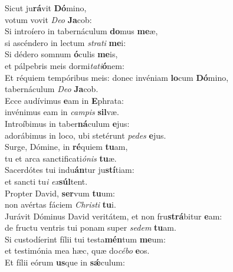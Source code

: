 \evenverse Sicut ju\textbf{rá}vit \textbf{Dó}mino,~\*\\
\evenverse votum vovit \textit{De}\textit{o} \textbf{Ja}cob:\\
\oddverse Si introíero in tabernáculum \textbf{do}mus \textbf{me}æ,~\*\\
\oddverse si ascéndero in lectum \textit{stra}\textit{ti} \textbf{me}i:\\
\evenverse Si dédero somnum \textbf{ó}culis \textbf{me}is,~\*\\
\evenverse et pálpebris meis dormi\textit{ta}\textit{ti}\textbf{ó}nem:\\
\oddverse Et réquiem tempóribus meis: donec invéniam \textbf{lo}cum \textbf{Dó}mino,~\*\\
\oddverse tabernáculum \textit{De}\textit{o} \textbf{Ja}cob.\\
\evenverse Ecce audívimus \textbf{e}am in \textbf{E}phrata:~\*\\
\evenverse invénimus eam in \textit{cam}\textit{pis} \textbf{sil}væ.\\
\oddverse Introíbimus in taber\textbf{ná}culum \textbf{e}jus:~\*\\
\oddverse adorábimus in loco, ubi stetérunt \textit{pe}\textit{des} \textbf{e}jus.\\
\evenverse Surge, Dómine, in \textbf{ré}quiem \textbf{tu}am,~\*\\
\evenverse tu et arca sanctificati\textit{ó}\textit{nis} \textbf{tu}æ.\\
\oddverse Sacerdótes tui indu\textbf{án}tur ju\textbf{stí}tiam:~\*\\
\oddverse et sancti tu\textit{i} \textit{ex}\textbf{súl}tent.\\
\evenverse Propter David, \textbf{ser}vum \textbf{tu}um:~\*\\
\evenverse non avértas fáciem \textit{Chri}\textit{sti} \textbf{tu}i.\\
\oddverse Jurávit Dóminus David veritátem, et non fru\textbf{strá}bitur \textbf{e}am:~\*\\
\oddverse de fructu ventris tui ponam super \textit{se}\textit{dem} \textbf{tu}am.\\
\evenverse Si custodíerint fílii tui testa\textbf{mén}tum \textbf{me}um:~\*\\
\evenverse et testimónia mea hæc, quæ do\textit{cé}\textit{bo} \textbf{e}os.\\
\oddverse Et fílii eórum \textbf{us}que in \textbf{sǽ}culum:~\*\\
